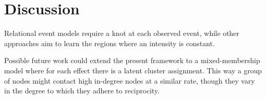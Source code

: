 \documentclass[11pt]{article}
\begin{document}
\section{Discussion}
Relational event models \cite{Butts2008} require a knot at each observed event, while other approaches \cite{Meek2011} aim to learn the regions where an intensity is constant.

Possible future work could extend the present framework to a mixed-membership model where for each effect there is a latent cluster assignment.  This way a group of nodes might contact high in-degree nodes at a similar rate, though they vary in the degree to which they adhere to reciprocity.



\end{document}
